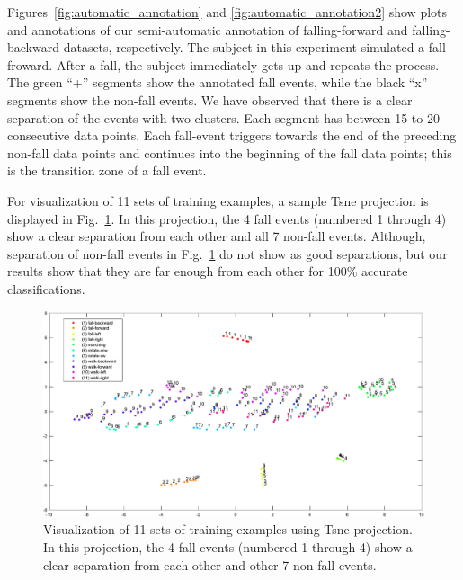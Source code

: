 \documentclass[]{IEEEtran}
\begin{document}
Figures~\ref{fig:automatic_annotation} and \ref{fig:automatic_annotation2} show plots and annotations of our semi-automatic annotation of falling-forward  and falling-backward datasets, respectively. The subject in this experiment simulated a fall froward. After a 
fall, the subject immediately gets up and repeats the process. The green ``+'' segments 
show the annotated fall events, while the black ``x'' segments show the non-fall 
events. We have observed that there is a clear separation of the events with two 
clusters. Each segment has between 15 to 20 consecutive data points.
Each fall-event triggers 
towards the end of the preceding non-fall data points and continues into the beginning of the fall data points; this is the transition zone of a fall event.

\par
For visualization of 11 sets of training examples, a sample Tsne projection  is displayed in Fig.~\ref{fig:automatic_annotation3}. In this projection, the 4 fall events (numbered 1 through 4) show a clear separation from each other and all 7 non-fall events. Although, separation of non-fall events in Fig.~\ref{fig:automatic_annotation3} do not show as good separations, but our results show that they are far enough from each other for 100\% accurate classifications.

\begin{figure}[!htb]
\centering
\includegraphics[width=\textwidth]{figures/viz_all_training_examples_crop2.pdf} 
\caption{Visualization of 11 sets of training examples using Tsne projection. In this projection, the 4 fall events (numbered 1 through 4) show a clear separation from each other and other 7 non-fall events.}
 \label{fig:automatic_annotation3} 
\end{figure}
\end{document}
